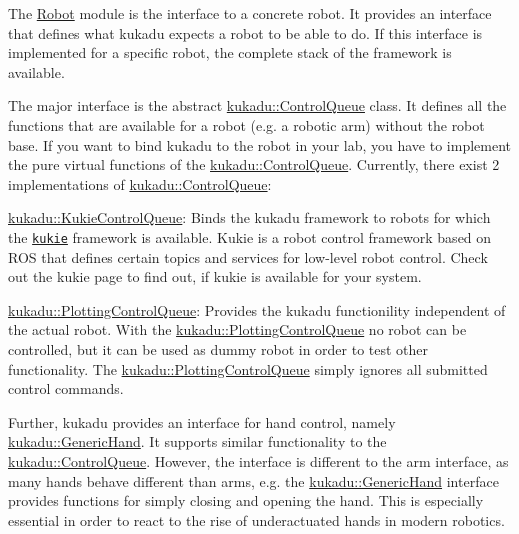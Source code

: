 The \hyperlink{group__Robot}{Robot} module is the interface to a concrete robot. It provides an interface that defines what kukadu expects a robot to be able to do. If this interface is implemented for a specific robot, the complete stack of the framework is available.

The major interface is the abstract \hyperlink{classkukadu_1_1ControlQueue}{kukadu\-::\-Control\-Queue} class. It defines all the functions that are available for a robot (e.\-g. a robotic arm) without the robot base. If you want to bind kukadu to the robot in your lab, you have to implement the pure virtual functions of the \hyperlink{classkukadu_1_1ControlQueue}{kukadu\-::\-Control\-Queue}. Currently, there exist 2 implementations of \hyperlink{classkukadu_1_1ControlQueue}{kukadu\-::\-Control\-Queue}\-:
\begin{DoxyItemize}
\item \hyperlink{classkukadu_1_1KukieControlQueue}{kukadu\-::\-Kukie\-Control\-Queue}\-: Binds the kukadu framework to robots for which the \href{https://iis.uibk.ac.at/intranet/projects/robot/armtopics}{\tt kukie} framework is available. Kukie is a robot control framework based on R\-O\-S that defines certain topics and services for low-\/level robot control. Check out the kukie page to find out, if kukie is available for your system.
\item \hyperlink{classkukadu_1_1PlottingControlQueue}{kukadu\-::\-Plotting\-Control\-Queue}\-: Provides the kukadu functionility independent of the actual robot. With the \hyperlink{classkukadu_1_1PlottingControlQueue}{kukadu\-::\-Plotting\-Control\-Queue} no robot can be controlled, but it can be used as dummy robot in order to test other functionality. The \hyperlink{classkukadu_1_1PlottingControlQueue}{kukadu\-::\-Plotting\-Control\-Queue} simply ignores all submitted control commands.
\end{DoxyItemize}

Further, kukadu provides an interface for hand control, namely \hyperlink{classkukadu_1_1GenericHand}{kukadu\-::\-Generic\-Hand}. It supports similar functionality to the \hyperlink{classkukadu_1_1ControlQueue}{kukadu\-::\-Control\-Queue}. However, the interface is different to the arm interface, as many hands behave different than arms, e.\-g. the \hyperlink{classkukadu_1_1GenericHand}{kukadu\-::\-Generic\-Hand} interface provides functions for simply closing and opening the hand. This is especially essential in order to react to the rise of underactuated hands in modern robotics.

